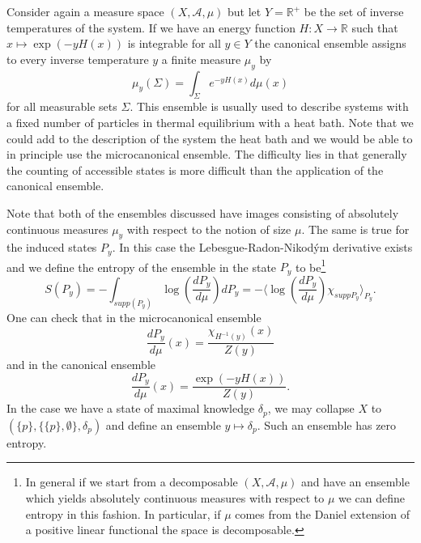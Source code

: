 \begin{example}\label{ex:canonical_ensemble}
Consider again a measure space $(X,\mathcal{A},\mu)$ but let $Y=\mathbb{R}^+$ be the set of inverse temperatures of the system. If we have an energy function $H:X\rightarrow \mathbb{R}$ such that $x\mapsto \exp(-y H(x))$ is integrable for all $y \in Y$ the canonical ensemble assigns to every inverse temperature $y$ a finite measure $\mu_y$ by
\begin{equation}
\mu_y(\Sigma)=\int_\Sigma e^{-y H(x)}d\mu(x)
\end{equation}
for all measurable sets $\Sigma$. This ensemble is usually used to describe systems with a fixed number of particles in thermal equilibrium with a heat bath. Note that we could add to the description of the system the heat bath and we would be able to in principle use the microcanonical ensemble. The difficulty lies in that generally the counting of accessible states is more difficult than the application of the canonical ensemble.
\end{example}

Note that both of the ensembles discussed have images consisting of absolutely continuous measures $\mu_y$ with respect to the notion of size $\mu$. The same is true for the induced states $P_y$. In this case the Lebesgue-Radon-Nikodým derivative exists and we define the entropy of the ensemble in the state $P_y$ to be\cite{Villani2012}\footnote{In general if we start from a decomposable $(X,\mathcal{A},\mu)$ and have an ensemble which yields absolutely continuous measures with respect to $\mu$ we can define entropy in this fashion. In particular, if $\mu$ comes from the Daniel extension of a positive linear functional the space is decomposable\cite{Hewitt1975}.}
\begin{equation}
S(P_y)=-\int_{supp(P_y)} \log\left(\frac{dP_y}{d\mu}\right)dP_y=-\langle\log\left(\frac{dP_y}{d\mu}\right)\chi_{supp P_y}\rangle_{P_y}.
\end{equation}
One can check that in the microcanonical ensemble 
\begin{equation}
\frac{dP_y}{d\mu}(x)=\frac{\chi_{H^{-1}(y)}(x)}{Z(y)}
\end{equation}
and in the canonical ensemble 
\begin{equation}
\frac{dP_y}{d\mu}(x)=\frac{\exp(-yH(x))}{Z(y)}. 
\end{equation}
In the case we have a state of maximal knowledge $\delta_p$, we may collapse $X$ to $(\{p\},\{\{p\},\emptyset\},\delta_p)$ and define an ensemble $y\mapsto \delta_p$. Such an ensemble has zero entropy.

